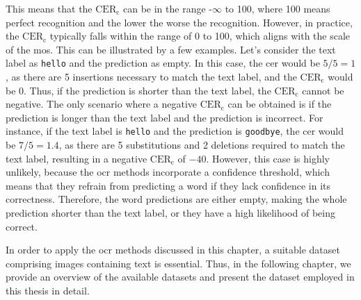 This means that the $\text{CER}_{\text{c}}$ can be in the range -$\infty$ to 100, where 100 means perfect recognition and the lower the worse the recognition.
However, in practice, the $\text{CER}_{\text{c}}$ typically falls within the range of 0 to 100, which aligns with the scale of the \gls{mos}.
This can be illustrated by a few examples.
Let's consider the text label as \texttt{hello} and the prediction as empty.
In this case, the \gls{cer} would be $5/5 = 1$, as there are 5 insertions necessary to match the text label, and the $\text{CER}_{\text{c}}$ would be $0$.
Thus, if the prediction is shorter than the text label, the $\text{CER}_{\text{c}}$ cannot be negative.
The only scenario where a negative $\text{CER}_{\text{c}}$ can be obtained is if the prediction is longer than the text label and the prediction is incorrect.
For instance, if the text label is \texttt{hello} and the prediction is \texttt{goodbye}, the \gls{cer} would be $7/5 = 1.4$, as there are 5 substitutions and 2 deletions required to match the text label, resulting in a negative $\text{CER}_{\text{c}}$ of $-40$.
However, this case is highly unlikely, because the \gls{ocr} methods incorporate a confidence threshold, which means that they refrain from predicting a word if they lack confidence in its correctness.
Therefore, the word predictions are either empty, making the whole prediction shorter than the text label, or they have a high likelihood of being correct.

In order to apply the \gls{ocr} methods discussed in this chapter, a suitable dataset comprising images containing text is essential.
Thus, in the following chapter, we provide an overview of the available datasets and present the dataset employed in this thesis in detail.
